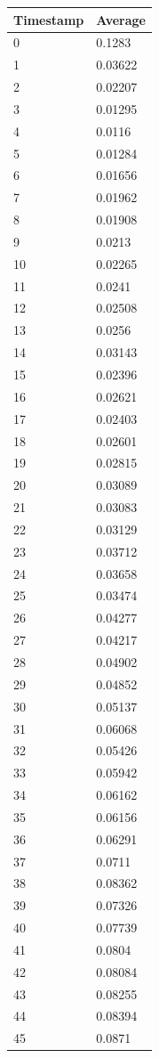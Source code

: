 \begin{tabular}{|l||l|}
\hline
	\textbf{Timestamp} & \textbf{Average} \\ \hline
	0 & 0.1283 \\ \hline
	1 & 0.03622 \\ \hline
	2 & 0.02207 \\ \hline
	3 & 0.01295 \\ \hline
	4 & 0.0116 \\ \hline
	5 & 0.01284 \\ \hline
	6 & 0.01656 \\ \hline
	7 & 0.01962 \\ \hline
	8 & 0.01908 \\ \hline
	9 & 0.0213 \\ \hline
	10 & 0.02265 \\ \hline
	11 & 0.0241 \\ \hline
	12 & 0.02508 \\ \hline
	13 & 0.0256 \\ \hline
	14 & 0.03143 \\ \hline
	15 & 0.02396 \\ \hline
	16 & 0.02621 \\ \hline
	17 & 0.02403 \\ \hline
	18 & 0.02601 \\ \hline
	19 & 0.02815 \\ \hline
	20 & 0.03089 \\ \hline
	21 & 0.03083 \\ \hline
	22 & 0.03129 \\ \hline
	23 & 0.03712 \\ \hline
	24 & 0.03658 \\ \hline
	25 & 0.03474 \\ \hline
	26 & 0.04277 \\ \hline
	27 & 0.04217 \\ \hline
	28 & 0.04902 \\ \hline
	29 & 0.04852 \\ \hline
	30 & 0.05137 \\ \hline
	31 & 0.06068 \\ \hline
	32 & 0.05426 \\ \hline
	33 & 0.05942 \\ \hline
	34 & 0.06162 \\ \hline
	35 & 0.06156 \\ \hline
	36 & 0.06291 \\ \hline
	37 & 0.0711 \\ \hline
	38 & 0.08362 \\ \hline
	39 & 0.07326 \\ \hline
	40 & 0.07739 \\ \hline
	41 & 0.0804 \\ \hline
	42 & 0.08084 \\ \hline
	43 & 0.08255 \\ \hline
	44 & 0.08394 \\ \hline
	45 & 0.0871 \\ \hline
\end{tabular}
